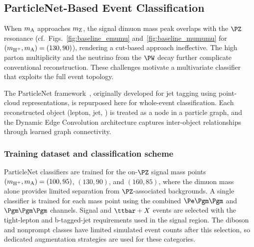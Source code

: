 \subsection{ParticleNet-Based Event Classification}
\label{ssec:particlenet}

When $m_{\text{A}}$ approaches $m_{\text{Z}}$, the signal dimuon mass peak overlaps with the $\PZ$ resonance (cf.\ Figs.~\ref{fig:baseline_emumu} and~\ref{fig:baseline_mumumu} for $(m_{\text{H}^+}, m_{\text{A}}) = (130, 90)$\GeV), rendering a cut-based approach ineffective. The high parton multiplicity and the neutrino from the $\PW$ decay further complicate conventional reconstruction. These challenges motivate a multivariate classifier that exploits the full event topology.

The ParticleNet framework~\cite{ParticleNet}, originally developed for jet tagging using point-cloud representations, is repurposed here for whole-event classification. Each reconstructed object (lepton, jet, \ptmiss) is treated as a node in a particle graph, and the Dynamic Edge Convolution architecture captures inter-object relationships through learned graph connectivity.

\subsubsection{Training dataset and classification scheme}

ParticleNet classifiers are trained for the on-$\PZ$ signal mass points $(m_{\text{H}^+}, m_{\text{A}}) = (100, 95)$, $(130, 90)$, and $(160, 85)$\GeV, where the dimuon mass alone provides limited separation from $\PZ$-associated backgrounds. A single classifier is trained for each mass point using the combined $\Pe\Pgm\Pgm$ and $\Pgm\Pgm\Pgm$ channels. Signal and $\ttbar+X$ events are selected with the tight-lepton and b-tagged-jet requirements used in the signal region. The diboson and nonprompt classes have limited simulated event counts after this selection, so dedicated augmentation strategies are used for these categories.


